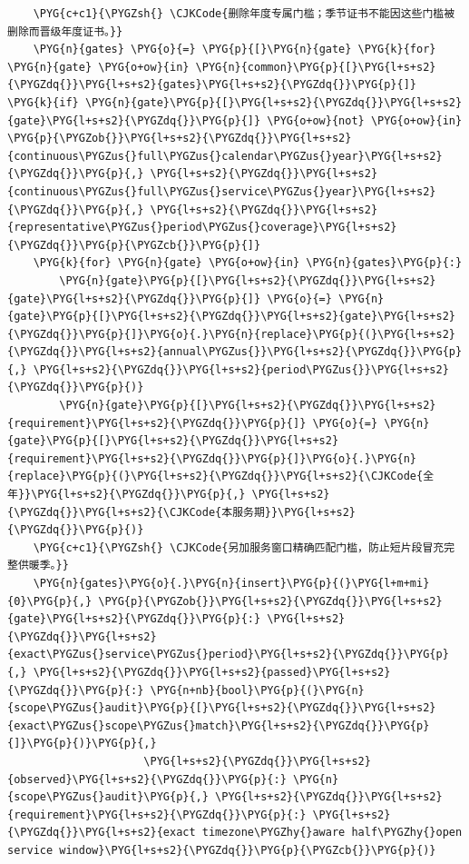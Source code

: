 \begin{Verbatim}
    \PYG{c+c1}{\PYGZsh{} \CJKCode{删除年度专属门槛；季节证书不能因这些门槛被删除而晋级年度证书。}}
    \PYG{n}{gates} \PYG{o}{=} \PYG{p}{[}\PYG{n}{gate} \PYG{k}{for} \PYG{n}{gate} \PYG{o+ow}{in} \PYG{n}{common}\PYG{p}{[}\PYG{l+s+s2}{\PYGZdq{}}\PYG{l+s+s2}{gates}\PYG{l+s+s2}{\PYGZdq{}}\PYG{p}{]} \PYG{k}{if} \PYG{n}{gate}\PYG{p}{[}\PYG{l+s+s2}{\PYGZdq{}}\PYG{l+s+s2}{gate}\PYG{l+s+s2}{\PYGZdq{}}\PYG{p}{]} \PYG{o+ow}{not} \PYG{o+ow}{in} \PYG{p}{\PYGZob{}}\PYG{l+s+s2}{\PYGZdq{}}\PYG{l+s+s2}{continuous\PYGZus{}full\PYGZus{}calendar\PYGZus{}year}\PYG{l+s+s2}{\PYGZdq{}}\PYG{p}{,} \PYG{l+s+s2}{\PYGZdq{}}\PYG{l+s+s2}{continuous\PYGZus{}full\PYGZus{}service\PYGZus{}year}\PYG{l+s+s2}{\PYGZdq{}}\PYG{p}{,} \PYG{l+s+s2}{\PYGZdq{}}\PYG{l+s+s2}{representative\PYGZus{}period\PYGZus{}coverage}\PYG{l+s+s2}{\PYGZdq{}}\PYG{p}{\PYGZcb{}}\PYG{p}{]}
    \PYG{k}{for} \PYG{n}{gate} \PYG{o+ow}{in} \PYG{n}{gates}\PYG{p}{:}
        \PYG{n}{gate}\PYG{p}{[}\PYG{l+s+s2}{\PYGZdq{}}\PYG{l+s+s2}{gate}\PYG{l+s+s2}{\PYGZdq{}}\PYG{p}{]} \PYG{o}{=} \PYG{n}{gate}\PYG{p}{[}\PYG{l+s+s2}{\PYGZdq{}}\PYG{l+s+s2}{gate}\PYG{l+s+s2}{\PYGZdq{}}\PYG{p}{]}\PYG{o}{.}\PYG{n}{replace}\PYG{p}{(}\PYG{l+s+s2}{\PYGZdq{}}\PYG{l+s+s2}{annual\PYGZus{}}\PYG{l+s+s2}{\PYGZdq{}}\PYG{p}{,} \PYG{l+s+s2}{\PYGZdq{}}\PYG{l+s+s2}{period\PYGZus{}}\PYG{l+s+s2}{\PYGZdq{}}\PYG{p}{)}
        \PYG{n}{gate}\PYG{p}{[}\PYG{l+s+s2}{\PYGZdq{}}\PYG{l+s+s2}{requirement}\PYG{l+s+s2}{\PYGZdq{}}\PYG{p}{]} \PYG{o}{=} \PYG{n}{gate}\PYG{p}{[}\PYG{l+s+s2}{\PYGZdq{}}\PYG{l+s+s2}{requirement}\PYG{l+s+s2}{\PYGZdq{}}\PYG{p}{]}\PYG{o}{.}\PYG{n}{replace}\PYG{p}{(}\PYG{l+s+s2}{\PYGZdq{}}\PYG{l+s+s2}{\CJKCode{全年}}\PYG{l+s+s2}{\PYGZdq{}}\PYG{p}{,} \PYG{l+s+s2}{\PYGZdq{}}\PYG{l+s+s2}{\CJKCode{本服务期}}\PYG{l+s+s2}{\PYGZdq{}}\PYG{p}{)}
    \PYG{c+c1}{\PYGZsh{} \CJKCode{另加服务窗口精确匹配门槛，防止短片段冒充完整供暖季。}}
    \PYG{n}{gates}\PYG{o}{.}\PYG{n}{insert}\PYG{p}{(}\PYG{l+m+mi}{0}\PYG{p}{,} \PYG{p}{\PYGZob{}}\PYG{l+s+s2}{\PYGZdq{}}\PYG{l+s+s2}{gate}\PYG{l+s+s2}{\PYGZdq{}}\PYG{p}{:} \PYG{l+s+s2}{\PYGZdq{}}\PYG{l+s+s2}{exact\PYGZus{}service\PYGZus{}period}\PYG{l+s+s2}{\PYGZdq{}}\PYG{p}{,} \PYG{l+s+s2}{\PYGZdq{}}\PYG{l+s+s2}{passed}\PYG{l+s+s2}{\PYGZdq{}}\PYG{p}{:} \PYG{n+nb}{bool}\PYG{p}{(}\PYG{n}{scope\PYGZus{}audit}\PYG{p}{[}\PYG{l+s+s2}{\PYGZdq{}}\PYG{l+s+s2}{exact\PYGZus{}scope\PYGZus{}match}\PYG{l+s+s2}{\PYGZdq{}}\PYG{p}{]}\PYG{p}{)}\PYG{p}{,}
                     \PYG{l+s+s2}{\PYGZdq{}}\PYG{l+s+s2}{observed}\PYG{l+s+s2}{\PYGZdq{}}\PYG{p}{:} \PYG{n}{scope\PYGZus{}audit}\PYG{p}{,} \PYG{l+s+s2}{\PYGZdq{}}\PYG{l+s+s2}{requirement}\PYG{l+s+s2}{\PYGZdq{}}\PYG{p}{:} \PYG{l+s+s2}{\PYGZdq{}}\PYG{l+s+s2}{exact timezone\PYGZhy{}aware half\PYGZhy{}open service window}\PYG{l+s+s2}{\PYGZdq{}}\PYG{p}{\PYGZcb{}}\PYG{p}{)}

\end{Verbatim}
